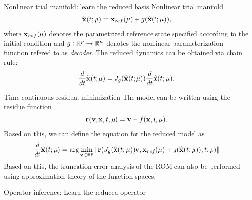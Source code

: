 \documentclass{beamer}
\begin{document}
\begin{frame}{Nonlinear trial manifold: learn the reduced basis}
	Nonlinear trial manifold\footnotemark
	\begin{equation*}
		\widetilde {\mathbf{x}}(t;\mu)= \mathbf{x}_{ref}(\mu) + g(\widehat {\mathbf{x}}(t;\mu)),
	\end{equation*}
	where $\mathbf{x}_{ref}(\mu)$ denotes the parametrized reference state specified according to the initial condition and $g:\mathbb{R}^p \rightarrow \mathbb{R}^n$
	denotes the nonlinear parameterization function refered to as \textit{decoder}.	The reduced dynamics can be obtained via chain rule:
	\begin{equation*}
		\frac{d}{dt}\widetilde {\mathbf{x}}(t;\mu) = J_g(\widehat {\mathbf{x}}(t;\mu))\frac{d}{dt}\widehat {\mathbf{x}}(t;\mu).
	\end{equation*}
\end{frame}

\begin{frame}{Time-continuous residual minimization}
	The model can be written using the residue function
	\begin{equation*}
		\mathbf{r}(\mathbf{v}, \mathbf{x}, t, \mu) =  \mathbf{v} - f(\mathbf{x}, t, \mu).
	\end{equation*}
	Based on this, we can define the equation for the reduced model as 
	\begin{equation*}
		\frac{d}{dt}\widehat {\mathbf{x}}(t;\mu) = \arg\min_{\mathbf{v}\in\mathbb{R}^p}\left\| \mathbf{r}(J_g(\widehat {\mathbf{x}}(t;\mu))\mathbf{v}, \mathbf{x}_{ref}(\mu) + g(\widehat {\mathbf{x}}(t;\mu)), t, \mu) \right\|
	\end{equation*}
	Based on this, the truncation error analysis of the ROM can also be performed using approximation theory of the function spaces.
\end{frame}

\begin{frame}{Operator inference: Learn the reduced operator}
	
\end{frame}
\end{document}

